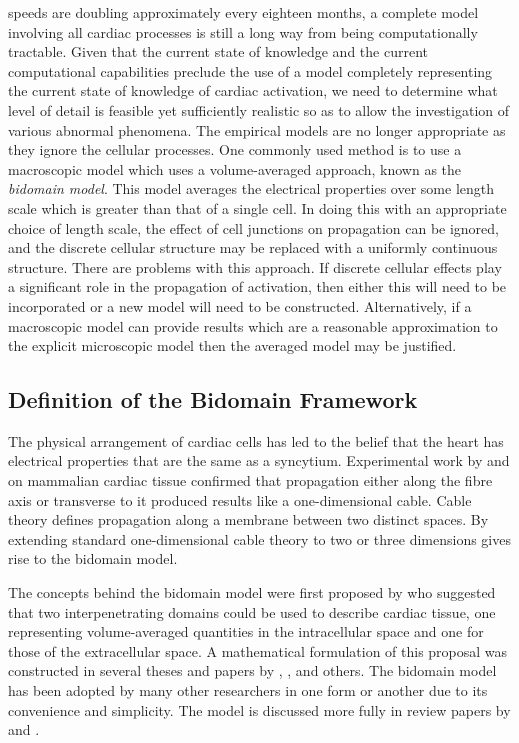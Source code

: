 speeds are doubling approximately every eighteen months, a complete
model involving all cardiac processes is still a long way from being
computationally tractable.  Given that the current state of knowledge
and the current computational capabilities preclude the use of a model
completely representing the current state of knowledge of cardiac
activation, we need to determine what level of detail is feasible yet
sufficiently realistic so as to allow the investigation of various
abnormal phenomena.  The empirical models are no longer appropriate as
they ignore the cellular processes.  One commonly used method is to
use a macroscopic model which uses a volume-averaged approach, known
as the \emph{bidomain model}.  This model averages the electrical
properties over some length scale which is greater than that of a
single cell.  In doing this with an appropriate choice of length
scale, the effect of cell junctions on propagation can be ignored, and
the discrete cellular structure may be replaced with a uniformly
continuous structure.  There are problems with this approach.  If
discrete cellular effects play a significant role in the propagation
of activation, then either this will need to be incorporated or a new
model will need to be constructed.  Alternatively, if a macroscopic
model can provide results which are a reasonable approximation to the
explicit microscopic model then the averaged model may be justified.

\subsection{Definition of the Bidomain Framework}

The physical arrangement of cardiac cells has led to the belief that the heart
has electrical properties that are the same as a syncytium.  Experimental work
by  and  on mammalian cardiac
tissue confirmed that propagation either along the fibre axis or transverse to
it produced results like a one-dimensional cable.  Cable theory defines
propagation along a membrane between two distinct spaces.  By extending
standard one-dimensional cable theory to two or three dimensions gives rise to
the bidomain model.

The concepts behind the bidomain model were first proposed by
 who suggested that two interpenetrating domains could
be used to describe cardiac tissue, one representing volume-averaged
quantities in the intracellular space and one for those of the extracellular
space.  A mathematical formulation of this proposal was constructed in several
theses and papers by , ,
 and others.  The bidomain model has been adopted by
many other researchers in one form or another due to its convenience and
simplicity.  The model is discussed more fully in review papers by
 and .  

